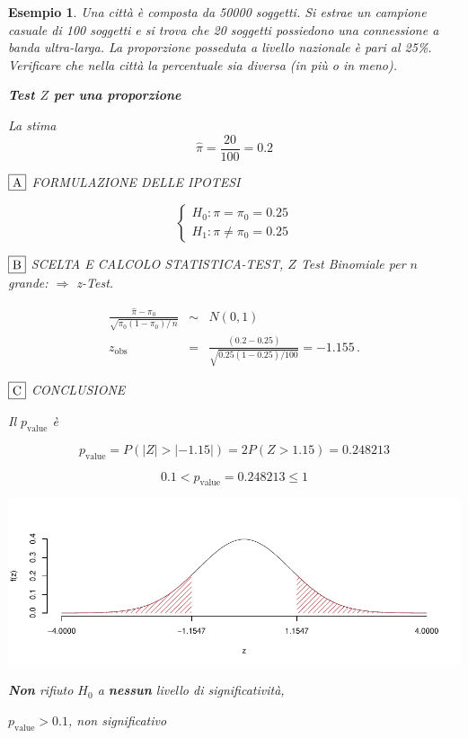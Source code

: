 \documentclass[
  11pt,
]{book}
\theoremstyle{mytheoremstyle}
\theoremstyle{mydefstyle}
\newtheorem{example}{{Esempio}}[section]
\begin{document}
\begin{example}
Una città è composta da 50000 soggetti. Si estrae un campione casuale di
100 soggetti e si trova che 20 soggetti possiedono una connessione a
banda ultra-larga. La proporzione posseduta a livello nazionale è pari
al 25\%. Verificare che nella città la
percentuale sia diversa (in più o in meno).

\textbf{Test \(Z\) per una proporzione}

La stima
\[\hat\pi=\frac { 20 } { 100 }= 0.2  \]

\(\fbox{A}\) FORMULAZIONE DELLE IPOTESI

\[\begin{cases}
   H_0: \pi = \pi_0=0.25 \\
   H_1: \pi \neq \pi_0=0.25 
   \end{cases}\]

\(\fbox{B}\) SCELTA E CALCOLO STATISTICA-TEST, \(Z\)
Test Binomiale per \(n\) grande: \(\Rightarrow\) z-Test.

\begin{eqnarray*}
   \frac{\hat\pi - \pi_{0}} {\sqrt {\pi_0(1-\pi_0)/\,n}}&\sim&N(0,1)\\
   z_{\text{obs}}
   &=& \frac{ ( 0.2 -  0.25 )} {\sqrt{ 0.25 (1- 0.25 )/ 100 }}
   =   -1.155 \,.
   \end{eqnarray*}

\(\fbox{C}\) CONCLUSIONE

Il \(p_{\text{value}}\) è

\[ p_{\text{value}} = P(|Z|>|-1.15|)=2P(Z>1.15)=0.248213 \]

\[
 0.1 < p_\text{value}= 0.248213 \leq 1 
\]

\begin{center}\includegraphics{Appunti_di_Statistica_2025_files/figure-latex/15-test-mu-pi-13,-1} \end{center}

\textbf{Non} rifiuto \(H_0\) a \textbf{nessun}
livello di significatività,

\(p_\text{value}>0.1\),
\emph{non significativo}
\end{example}
\end{document}
